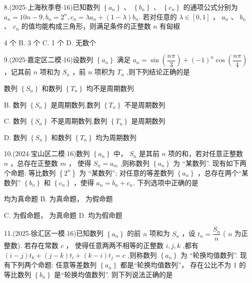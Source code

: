 8.(2025$\cdot$上海秋季卷$\cdot$16)已知数列 $\left\{  {a}_{n}\right\}$ 、 $\left\{  {b}_{n}\right\}$ 、 $\left\{  {c}_{n}\right\}$ 的通项公式分别为 ${a}_{n} = {10n} - 9,{b}_{n} = {2}^{n},{c}_{n} = \lambda {a}_{n} +  \left( {1 - \lambda }\right) {b}_{n}$. 若对任意的 $\lambda  \in  \left\lbrack  {0,1}\right\rbrack$ ， ${a}_{n}$ 、 ${b}_{n}$ 、 ${c}_{n}$ 的值均能构成三角形，则满足条件的正整数 $n$ 有\blkda[2]{}匈椒

\xx{}{}{}{}4 个 B. 3 个 C. 1 个 D. 无数个

9.(2025$\cdot$嘉定区二模$\cdot$16)设数列 $\left\{  {a}_{n}\right\}$ 满足 ${a}_{n} = \sin \left( \dfrac{n\pi }{3}\right)  + {\left( -1\right) }^{n}\cos \left( \dfrac{n\pi }{4}\right)$ ，记其前 $n$ 项和为 ${S}_{n}$ ，前 $n$ 项积为 ${T}_{n}$ ,则下列结论正确的是 \dotfill{(\kh{})}

\xx{}{}{}{}数列 $\left\{  {S}_{n}\right\}$ 和数列 $\left\{  {T}_{n}\right\}$ 均不是周期数列

B. 数列 $\left\{  {S}_{n}\right\}$ 是周期数列,数列 $\left\{  {T}_{n}\right\}$ 不是周期数列

C. 数列 $\left\{  {S}_{n}\right\}$ 不是周期数列,数列 $\left\{  {T}_{n}\right\}$ 是周期数列

D. 数列 $\left\{  {S}_{n}\right\}$ 和数列 $\left\{  {T}_{n}\right\}$ 均为周期数列

10.(2024$\cdot$宝山区二模$\cdot$16)数列 $\left\{  {a}_{n}\right\}$ 中， ${S}_{n}$ 是其前 $n$ 项的和，若对任意正整数 $n$ ，总存在正整数 $m$ ， 使得 ${S}_{n} = {a}_{m}$ ,则称数列 $\left\{  {a}_{n}\right\}$ 为 “某数列”. 现有如下两个命题:    等比数列 $\left\{  {2}^{n}\right\}$ 为 “某数列”;    对任意的等差数列 $\left\{  {a}_{n}\right\}$ ，总存在两个“某数列” $\left\{  {b}_{n}\right\}$ 和 $\left\{  {c}_{n}\right\}$ ，使得 ${a}_{n} = {b}_{n} + {c}_{n}$. 下列选项中正确的是 \dotfill{(\kh{})}

\xx{}{}{}{}    均为真命题 B.   为真命题，  为假命题

C.   为假命题，  为真命题 D.     均为假命题

11.(2025$\cdot$徐汇区一模$\cdot$16)已知数列 $\left\{  {a}_{n}\right\}$ 的前 $n$ 项和为 ${S}_{n}$ ，设 ${t}_{n} = \dfrac{{S}_{n}}{n}$ ( $n$ 为正整数). 若存在常数 $c$ ， 使得任意两两不相等的正整数 $i,j,k$ ,都有 $\left( {i - j}\right) {t}_{k} + \left( {j - k}\right) {t}_{i} + \left( {k - i}\right) {t}_{j} = c$ ,则称数列 $\left\{  {a}_{n}\right\}$ 为 “轮换均值数列”. 现有下列两个命题:   任意等差数列 $\left\{  {a}_{n}\right\}$ 都是“轮换均值数列”，   存在公比不为 1 的等比数列 $\left\{  {b}_{n}\right\}$ 是“轮换均值数列”. 则下列说法正确的是 \dotfill{(\kh{})}

